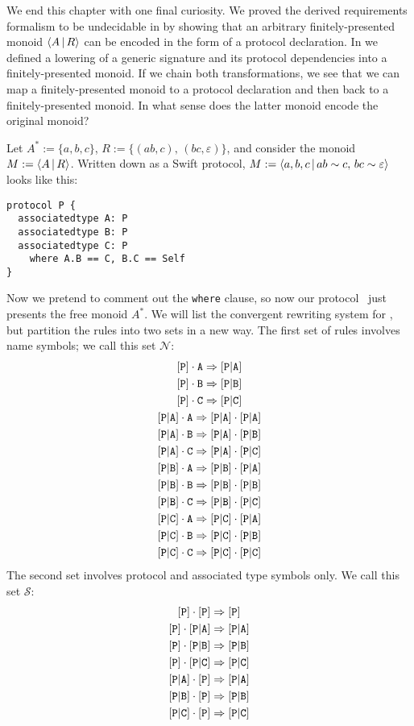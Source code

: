 \documentclass[../generics]{subfiles}
\begin{document}
\begin{example}\label{double encoding}
We end this chapter with one final curiosity. We proved the derived requirements formalism to be undecidable in  by showing that an arbitrary finitely-presented monoid $\langle A\,|\,R\rangle$ can be encoded in the form of a protocol declaration. In  we defined a lowering of a generic signature and its protocol dependencies into a finitely-presented monoid. If we chain both transformations, we see that we can map a finitely-presented monoid to a protocol declaration and then back to a finitely-presented monoid. In what sense does the latter monoid encode the original monoid?

Let $A^*:=\{a,b,c\}$, $R:=\{(ab,c),\,(bc,\varepsilon)\}$, and consider the monoid $M:=\langle A\,|\,R\rangle$. Written down as a Swift protocol, $M := \langle a,b,c\,|\,ab\sim c,\,bc\sim\varepsilon\rangle$ looks like this:
\begin{Verbatim}
protocol P {
  associatedtype A: P
  associatedtype B: P
  associatedtype C: P
    where A.B == C, B.C == Self
}
\end{Verbatim}
Now we pretend to comment out the \texttt{where} clause, so now our protocol \tP\ just presents the free monoid $A^*$. We will list the convergent rewriting system for \tP, but partition the rules into two sets in a new way. The first set of rules involves name symbols; we call this set $\mathcal{N}$:
\begin{gather*}
\AssocIntro{P}{A}\\
\AssocIntro{P}{B}\\
\AssocIntro{P}{C}\\
\aPA\cdot\nA\Rightarrow\aPA\cdot\aPA\\
\aPA\cdot\nB\Rightarrow\aPA\cdot\aPB\\
\aPA\cdot\nC\Rightarrow\aPA\cdot\aPC\\
\aPB\cdot\nA\Rightarrow\aPB\cdot\aPA\\
\aPB\cdot\nB\Rightarrow\aPB\cdot\aPB\\
\aPB\cdot\nC\Rightarrow\aPB\cdot\aPC\\
\aPC\cdot\nA\Rightarrow\aPC\cdot\aPA\\
\aPC\cdot\nB\Rightarrow\aPC\cdot\aPB\\
\aPC\cdot\nC\Rightarrow\aPC\cdot\aPC
\end{gather*}
The second set involves protocol and associated type symbols only. We call this set $\mathcal{S}$:
\begin{gather*}
\ProtoInherit{P}{P}\\
\pP\cdot\aPA\Rightarrow\aPA\\
\pP\cdot\aPB\Rightarrow\aPB\\
\pP\cdot\aPC\Rightarrow\aPC\\
\ProtoConf{\aPA}{P}\\
\ProtoConf{\aPB}{P}\\
\ProtoConf{\aPC}{P}
\end{gather*}


\end{example}
\end{document}
